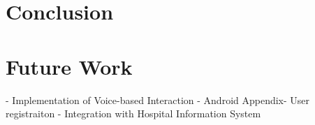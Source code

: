 \section{Conclusion}

\section{Future Work}
- Implementation of Voice-based Interaction
- Android Appendix- User registraiton
- Integration with Hospital Information System